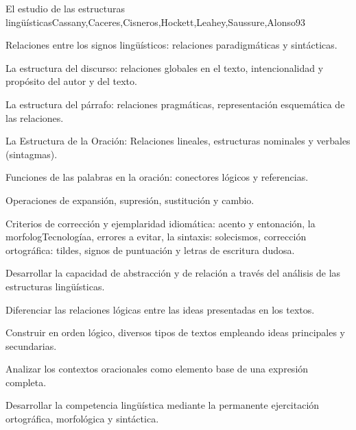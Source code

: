 \begin{syllabus}
\begin{unit}{El estudio de las estructuras lingüísticas}{Cassany,Caceres,Cisneros,Hockett,Leahey,Saussure,Alonso}{9}{3}
\begin{topics}
   \item Relaciones entre los signos lingüísticos: relaciones paradigmáticas y sintácticas.
   \item La estructura del discurso: relaciones globales en el texto, intencionalidad y propósito del autor y del texto. 
   \item La estructura del párrafo: relaciones pragmáticas, representación esquemática de las relaciones. 
   \item La Estructura de la Oración: Relaciones lineales, estructuras nominales y verbales (sintagmas).
   \item Funciones de las palabras en la oración: conectores lógicos y referencias.
   \item Operaciones de expansión, supresión, sustitución y cambio.
   \item Criterios de corrección y ejemplaridad idiomática: acento y entonación, la morfologTecnologíaa, errores a evitar, la sintaxis: solecismos, corrección ortográfica: tildes, signos de puntuación y letras de escritura dudosa.
\end{topics}

\begin{learningoutcomes}
   \item Desarrollar la capacidad de abstracción y de relación a través del análisis de las estructuras lingüísticas.
   \item Diferenciar las relaciones lógicas entre las ideas presentadas en los textos.
   \item Construir en orden lógico, diversos tipos de textos empleando ideas principales y secundarias.
   \item Analizar los contextos oracionales como elemento base de una expresión completa.
   \item Desarrollar la competencia lingüística mediante la permanente ejercitación ortográfica, morfológica y sintáctica.
\end{learningoutcomes}
\end{unit}


\end{syllabus}
